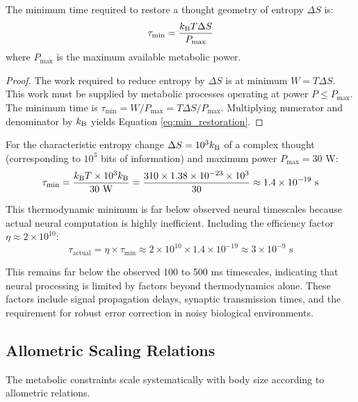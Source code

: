 \begin{theorem}
\label{thm:min_restoration}
The minimum time required to restore a thought geometry of entropy $\Delta S$ is:
\begin{equation}
\tau_{\min} = \frac{k_{\mathrm{B}} T \Delta S}{P_{\max}}
\label{eq:min_restoration}
\end{equation}
where $P_{\max}$ is the maximum available metabolic power.
\end{theorem}

\begin{proof}
The work required to reduce entropy by $\Delta S$ is at minimum $W = T \Delta S$. This work must be supplied by metabolic processes operating at power $P \leq P_{\max}$. The minimum time is $\tau_{\min} = W / P_{\max} = T \Delta S / P_{\max}$. Multiplying numerator and denominator by $k_{\mathrm{B}}$ yields Equation \ref{eq:min_restoration}.
\end{proof}

For the characteristic entropy change $\Delta S = 10^3 k_{\mathrm{B}}$ of a complex thought (corresponding to $10^3$ bits of information) and maximum power $P_{\max} = 30$ W:
\begin{equation}
\tau_{\min} = \frac{k_{\mathrm{B}} T \times 10^3 k_{\mathrm{B}}}{30 \text{ W}} = \frac{310 \times 1.38 \times 10^{-23} \times 10^3}{30} \approx 1.4 \times 10^{-19} \text{ s}
\end{equation}

This thermodynamic minimum is far below observed neural timescales because actual neural computation is highly inefficient. Including the efficiency factor $\eta \approx 2 \times 10^{10}$:
\begin{equation}
\tau_{\text{actual}} = \eta \times \tau_{\min} \approx 2 \times 10^{10} \times 1.4 \times 10^{-19} \approx 3 \times 10^{-9} \text{ s}
\end{equation}

This remains far below the observed 100 to 500 ms timescales, indicating that neural processing is limited by factors beyond thermodynamics alone. These factors include signal propagation delays, synaptic transmission times, and the requirement for robust error correction in noisy biological environments.

\subsection{Allometric Scaling Relations}

The metabolic constraints scale systematically with body size according to allometric relations.

